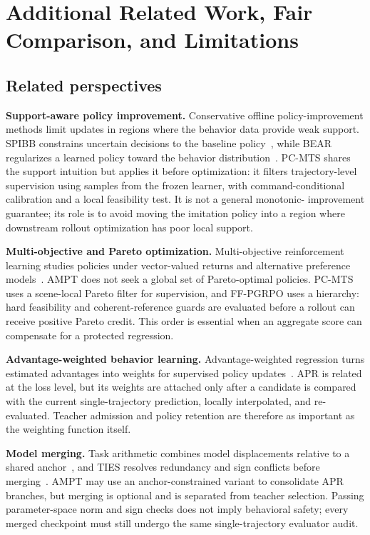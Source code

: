 \section{Additional Related Work, Fair Comparison, and Limitations}
\label{sec:related-limitations}

\subsection{Related perspectives}

\textbf{Support-aware policy improvement.}
Conservative offline policy-improvement methods limit updates in regions where
the behavior data provide weak support.  SPIBB constrains uncertain decisions
to the baseline policy~\cite{spibb2019}, while BEAR regularizes a learned policy
toward the behavior distribution~\cite{bear2019}.  PC-MTS shares the support
intuition but applies it before optimization: it filters trajectory-level
supervision using samples from the frozen learner, with command-conditional
calibration and a local feasibility test.  It is not a general monotonic-
improvement guarantee; its role is to avoid moving the imitation policy into a
region where downstream rollout optimization has poor local support.

\textbf{Multi-objective and Pareto optimization.}
Multi-objective reinforcement learning studies policies under vector-valued
returns and alternative preference models~\cite{roijers2013}.  AMPT does not
seek a global set of Pareto-optimal policies.  PC-MTS uses a scene-local Pareto
filter for supervision, and FF-PGRPO uses a hierarchy: hard feasibility and
coherent-reference guards are evaluated before a rollout can receive positive
Pareto credit.  This order is essential when an aggregate score can compensate
for a protected regression.

\textbf{Advantage-weighted behavior learning.}
Advantage-weighted regression turns estimated advantages into weights for
supervised policy updates~\cite{awr2021}.  APR is related at the loss level,
but its weights are attached only after a candidate is compared with the
current single-trajectory prediction, locally interpolated, and re-evaluated.
Teacher admission and policy retention are therefore as important as the
weighting function itself.

\textbf{Model merging.}
Task arithmetic combines model displacements relative to a shared
anchor~\cite{taskarithmetic2023}, and TIES resolves redundancy and sign
conflicts before merging~\cite{ties2023}.  AMPT may use an anchor-constrained
variant to consolidate APR branches, but merging is optional and is separated
from teacher selection.  Passing parameter-space norm and sign checks does not
imply behavioral safety; every merged checkpoint must still undergo the same
single-trajectory evaluator audit.


